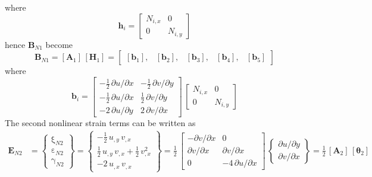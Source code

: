 where 
\begin{equation}
\mathbf{h}_i = \begin{bmatrix}
N_{i,x} &  0  \\
0 & N_{i,y}  \end{bmatrix} 
\end{equation}
hence $\mathbf{B}_{N1}$ become
\begin{equation}
\mathbf{B}_{N1} = [\mathbf{A}_1] \, [\mathbf{H}_1] = \begin{bmatrix}
 [\mathbf{b}_1], & [\mathbf{b}_2], & [\mathbf{b}_3], & [\mathbf{b}_4], & [\mathbf{b}_5] 
\end{bmatrix} 
\end{equation}
where
\begin{equation}
\mathbf{b}_i = \begin{bmatrix}
-\tfrac{1}{2} \, \partial u / \partial x &  - \tfrac{1}{2} \, \partial v / \partial y \\
-\tfrac{1}{2} \, \partial u / \partial x &  \tfrac{1}{2} \, \partial v / \partial y \\
-2 \, \partial u / \partial y  & 2 \, \partial v / \partial x  \end{bmatrix}  \, \begin{bmatrix}
N_{i,x} &  0  \\
0 & N_{i,y}  \end{bmatrix} 
\end{equation}
The second nonlinear strain terms can be written as 
\begin{equation}
\begin{aligned}
\mathbf{E}_{N2} & =  \begin{Bmatrix}
\mathrm \xi_{N2} \\
\mathrm \varepsilon_{N2} \\
\mathrm \gamma_{N2} \end{Bmatrix} =
 \begin{Bmatrix}
-\tfrac{1}{2} \, u_{,y} \, v_{,x}  \\
\tfrac{1}{2} \, u_{,y} \, v_{,x}  + \tfrac{1}{2} \, v_{,x}^2 \\
-2 \, u_{,x} \, v_{,x} \end{Bmatrix} = \frac{1}{2} \, \begin{bmatrix}
- \partial v / \partial x &  0 \\
 \partial v / \partial x &  \partial v / \partial x \\
0 & -4 \, \partial u / \partial x  \end{bmatrix} \, \begin{Bmatrix}
\partial u / \partial y\\
\partial v / \partial x
\end{Bmatrix}
= \tfrac{1}{2} \, [\mathbf{A}_2] \, [\boldsymbol{\theta}_2]
\end{aligned}
\end{equation}

